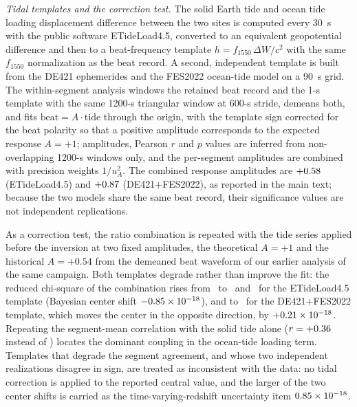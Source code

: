 \emph{Tidal templates and the correction test.} The solid Earth tide
and ocean tide loading displacement difference between the two sites
is computed every \qty{30}{s} with the public software
ETideLoad4.5, converted to an equivalent geopotential difference and
then to a beat-frequency template $h = f_{1550}\,\Delta W/c^2$ with
the same $f_{1550}$ normalization as the beat record. A second,
independent template is built from the DE421 ephemerides and the
FES2022 ocean-tide model on a \qty{90}{s} grid. The within-segment
analysis windows the retained beat record and the 1-s template with
the same 1200-s triangular window at 600-s stride, demeans both, and
fits $\mathrm{beat} = A\cdot\mathrm{tide}$ through the origin, with
the template sign corrected for the beat polarity so that a positive
amplitude corresponds to the expected response $A = +1$; amplitudes,
Pearson $r$ and $p$ values are inferred from non-overlapping 1200-s
windows only, and the per-segment amplitudes are combined with
precision weights $1/u_A^2$. The combined response amplitudes are
$+0.58$ (ETideLoad4.5) and $+0.87$
(DE421+FES2022), as reported in the main text; because the two models
share the same beat record, their significance values are not
independent replications.

As a correction test, the ratio combination is repeated with the tide
series applied before the inversion at two fixed amplitudes, the
theoretical $A = +1$ and the historical $A = +0.54$ from the demeaned
beat waveform of our earlier analysis of the same campaign. Both
templates degrade rather than improve the fit: the reduced chi-square
of the combination rises from \tidalChiRaw~to \tidalChiTheory~and
\tidalChiEmp~for the ETideLoad4.5 template (Bayesian center shift
$-0.85\times10^{-18}$), and to \tidalChiAlt~for the
DE421+FES2022 template, which moves the center in the opposite
direction, by $+0.21\times10^{-18}$. Repeating the
segment-mean correlation with the solid tide alone
($r = +0.36$ instead of \tidalCorrTotal) locates the
dominant coupling in the ocean-tide loading term. Templates that
degrade the segment agreement, and whose two independent realizations
disagree in sign, are treated as inconsistent with the data: no tidal
correction is applied to the reported central value, and the larger of
the two center shifts is carried as the time-varying-redshift
uncertainty item $0.85\times10^{-18}$.


